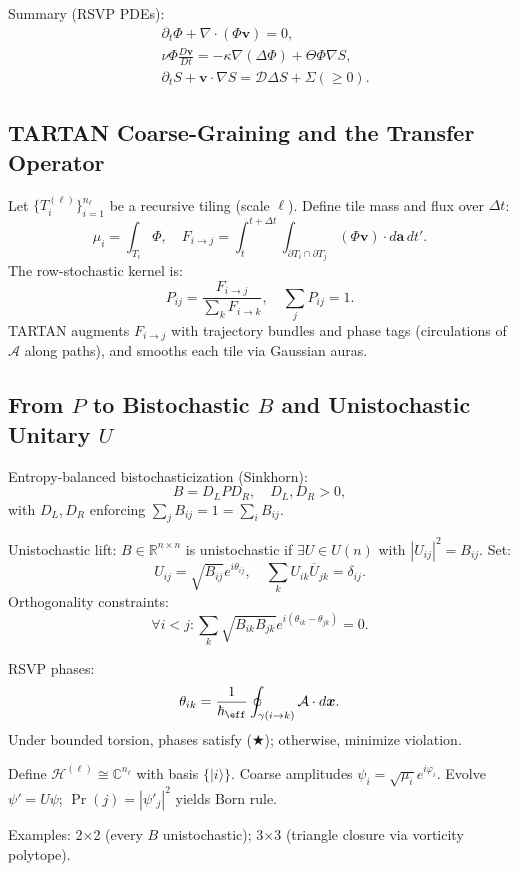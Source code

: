 \documentclass[11pt]{article}
\theoremstyle{plain}
\theoremstyle{definition}
\begin{document}
Summary (RSVP PDEs):
\[
\boxed{
\begin{aligned}
&\partial_t \Phi + \nabla \cdot (\Phi \bm{v}) = 0, \\
&\nu \Phi \frac{D \bm{v}}{Dt} = -\kappa \nabla (\Delta \Phi) + \Theta \Phi \nabla S, \\
&\partial_t S + \bm{v} \cdot \nabla S = \mathcal{D} \Delta S + \Sigma (\geq 0).
\end{aligned}
}
\]

\subsection{TARTAN Coarse-Graining and the Transfer Operator}
Let $\{T_i^{(\ell)}\}_{i=1}^{n_\ell}$ be a recursive tiling (scale $\ell$). Define tile mass and flux over $\Delta t$:
\[
\mu_i = \int_{T_i} \Phi, \quad F_{i \to j} = \int_t^{t+\Delta t} \int_{\partial T_i \cap \partial T_j} (\Phi \bm{v}) \cdot d\bm{a} \, dt'.
\]
The row-stochastic kernel is:
\[
P_{ij} = \frac{F_{i \to j}}{\sum_k F_{i \to k}}, \quad \sum_j P_{ij} = 1.
\]
TARTAN augments $F_{i \to j}$ with trajectory bundles and phase tags (circulations of $\mathcal{A}$ along paths), and smooths each tile via Gaussian auras.

\subsection{From $P$ to Bistochastic $B$ and Unistochastic Unitary $U$}
Entropy-balanced bistochasticization (Sinkhorn):
\[
B = D_L P D_R, \quad D_L, D_R > 0,
\]
with $D_L, D_R$ enforcing $\sum_j B_{ij} = 1 = \sum_i B_{ij}$.

Unistochastic lift: $B \in \mathbb{R}^{n \times n}$ is unistochastic if $\exists U \in U(n)$ with $|U_{ij}|^2 = B_{ij}$. Set:
\[
U_{ij} = \sqrt{B_{ij}} e^{i \theta_{ij}}, \quad \sum_k U_{ik} \overline{U}_{jk} = \delta_{ij}.
\]
Orthogonality constraints:
\[
\forall i < j: \sum_k \sqrt{B_{ik} B_{jk}} e^{i (\theta_{ik} - \theta_{jk})} = 0. \tag{★}
\]

RSVP phases: 
\[
\theta_{ik} = \frac{1}{\hbar_{\eff}} \oint_{\gamma(i \to k)} \mathcal{A} \cdot d\bm{x}.
\]
Under bounded torsion, phases satisfy (★); otherwise, minimize violation.

Define $\mathcal{H}^{(\ell)} \cong \mathbb{C}^{n_\ell}$ with basis $\{|i\rangle\}$. Coarse amplitudes $\psi_i = \sqrt{\mu_i} e^{i \varphi_i}$. Evolve $\psi' = U \psi$; $\Pr(j) = |\psi'_j|^2$ yields Born rule.

Examples: 2×2 (every $B$ unistochastic); 3×3 (triangle closure via vorticity polytope).
\end{document}
